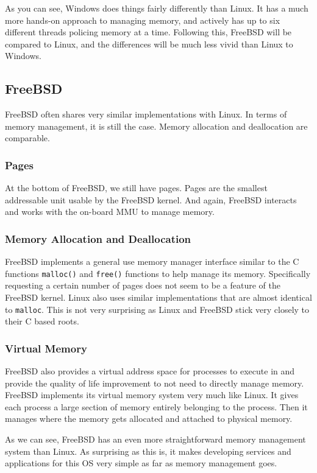 \documentclass[10pt,letterpaper,onecolumn,draftclsnofoot]{IEEEtran}
\begin{document}
As you can see, Windows does things fairly differently than Linux. It has a much
more hands-on approach to managing memory, and actively has up to six different
threads policing memory at a time. Following this, FreeBSD will be compared to
Linux, and the differences will be much less vivid than Linux to Windows.

\subsection{FreeBSD}
FreeBSD often shares very similar implementations with Linux. In terms of memory
management, it is still the case. Memory allocation and deallocation are comparable.

\subsubsection{Pages}
At the bottom of FreeBSD, we still have pages. Pages are the smallest addressable
unit usable by the FreeBSD kernel. And again, FreeBSD interacts and works with the
on-board MMU to manage memory.

\subsubsection{Memory Allocation and Deallocation}
FreeBSD implements a general use memory manager interface similar to the C
functions \texttt{malloc()} and
\texttt{free()} functions to help manage its memory. Specifically requesting
a certain number of pages does not seem to be a feature of the FreeBSD kernel.
Linux also uses similar implementations that are almost identical to \texttt{malloc}.
This is not very surprising as Linux and FreeBSD stick very closely to their C
based roots. \cite{freebsd2016}

\subsubsection{Virtual Memory}
FreeBSD also provides a virtual address space for processes to execute in
and provide the quality of life improvement to not need to directly manage
memory. FreeBSD implements its virtual memory system very much like Linux.
It gives each process a large section of memory entirely belonging to the
process. Then it manages where the memory gets allocated and attached to
physical memory.

As we can see, FreeBSD has an even more straightforward memory management system
than Linux. As surprising as this is, it makes developing services and applications
for this OS very simple as far as memory management goes.
\end{document}
